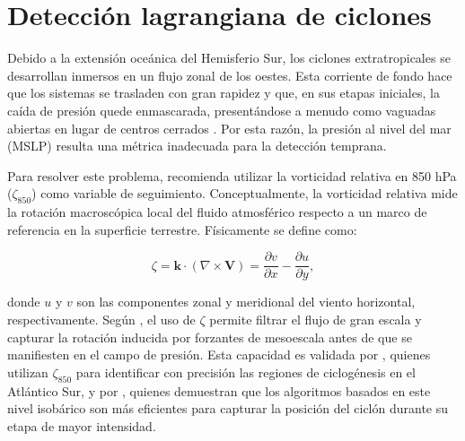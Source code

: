 
\section{Detección lagrangiana de ciclones}\label{sec:tb_vorticidad}

Debido a la extensión oceánica del Hemisferio Sur, los ciclones extratropicales se desarrollan inmersos en un flujo zonal de los oestes. Esta corriente de fondo hace que los sistemas se trasladen con gran rapidez y que, en sus etapas iniciales, la caída de presión quede enmascarada, presentándose a menudo como vaguadas abiertas en lugar de centros cerrados \citep{sinclair1994objective}. Por esta razón, la presión al nivel del mar (MSLP) resulta una métrica inadecuada para la detección temprana.

Para resolver este problema, \citet{sinclair1997objective} recomienda utilizar la vorticidad relativa en 850 hPa ($\zeta_{850}$) como variable de seguimiento. Conceptualmente, la vorticidad relativa mide la rotación macroscópica local del fluido atmosférico respecto a un marco de referencia en la superficie terrestre. Físicamente se define como:

\begin{equation}\label{eq:vorticidad_relativa}
\zeta = \mathbf{k} \cdot (\nabla \times \mathbf{V}) = \frac{\partial v}{\partial x} - \frac{\partial u}{\partial y},
\end{equation}

\noindent donde $u$ y $v$ son las componentes zonal y meridional del viento horizontal, respectivamente. Según \citet{hoskins2005new}, el uso de $\zeta$ permite filtrar el flujo de gran escala y capturar la rotación inducida por forzantes de mesoescala antes de que se manifiesten en el campo de presión. Esta capacidad es validada por \citet{gramcianinov2019properties}, quienes utilizan $\zeta_{850}$ para identificar con precisión las regiones de ciclogénesis en el Atlántico Sur, y por \citet{padilhareinke2024objective}, quienes demuestran que los algoritmos basados en este nivel isobárico son más eficientes para capturar la posición del ciclón durante su etapa de mayor intensidad.

